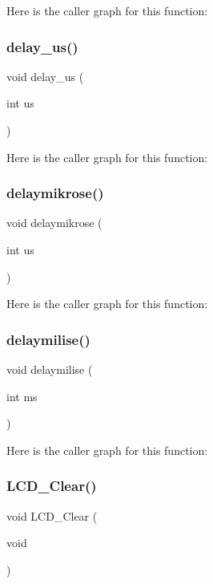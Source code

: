 Here is the caller graph for this function\+:
\mbox{\label{lcd4bit_8c_a3f88352450dad51d82e4bf84a0a439a1}} 
\subsubsection{delay\+\_\+us()}
{\footnotesize\ttfamily void delay\+\_\+us (\begin{DoxyParamCaption}\item[{int}]{us }\end{DoxyParamCaption})}

Here is the caller graph for this function\+:
\mbox{\label{lcd4bit_8c_a3bdf4b71c2ded53c6ab07b1caf6d25f7}} 
\subsubsection{delaymikrose()}
{\footnotesize\ttfamily void delaymikrose (\begin{DoxyParamCaption}\item[{int}]{us }\end{DoxyParamCaption})}

Here is the caller graph for this function\+:
\mbox{\label{lcd4bit_8c_a487c23c6931fcdfe8e521ab18570e54a}} 
\subsubsection{delaymilise()}
{\footnotesize\ttfamily void delaymilise (\begin{DoxyParamCaption}\item[{int}]{ms }\end{DoxyParamCaption})}

Here is the caller graph for this function\+:
\mbox{\label{lcd4bit_8c_ae60d0b62d7eb3fa31266c095d7b3c245}} 
\subsubsection{L\+C\+D\+\_\+\+Clear()}
{\footnotesize\ttfamily void L\+C\+D\+\_\+\+Clear (\begin{DoxyParamCaption}\item[{void}]{ }\end{DoxyParamCaption})}

